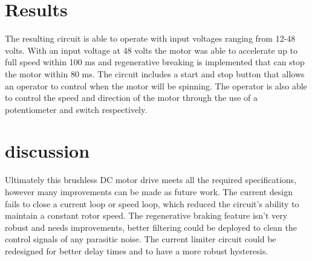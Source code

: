 \documentclass[journal,10pt]{IEEEtran}
\begin{document}
    
\section{Results}
	The resulting circuit is able to operate with input voltages ranging from 12-48 volts.  With an input voltage at 48 volts the motor was able to accelerate up to full speed within 100 ms and regenerative breaking is implemented that can stop the motor within 80 ms. The circuit includes a start and stop button that allows an operator to control when the motor will be spinning. The operator is also able to control the speed and direction of the motor through the use of a potentiometer and switch respectively. 
\newpage
\balance
\section{discussion}
	Ultimately this brushless DC motor drive meets all the required specifications, however many improvements can be made as future work. The current design fails to close a current loop or speed loop, which reduced the circuit's ability to maintain a constant rotor speed. The regenerative braking feature isn't very robust and needs improvements, better filtering could be deployed to clean the control signals of any parasitic noise. The current limiter circuit could be redesigned for better delay times and to have a more robust hysteresis.
\vspace{0.5cm}






\end{document}

